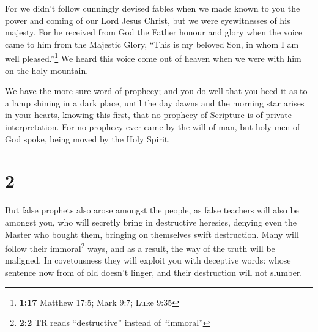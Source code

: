  For we didn't follow cunningly devised fables when we
made known to you the power and coming of our Lord Jesus Christ, but we
were eyewitnesses of his majesty.  For he received from
God the Father honour and glory when the voice came to him from the
Majestic Glory, ``This is my beloved Son, in whom I am well
pleased.''\footnote{\textbf{1:17} Matthew 17:5; Mark 9:7; Luke 9:35}
 We heard this voice come out of heaven when we were with
him on the holy mountain.

 We have the more sure word of prophecy; and you do well
that you heed it as to a lamp shining in a dark place, until the day
dawns and the morning star arises in your hearts, 
knowing this first, that no prophecy of Scripture is of private
interpretation.  For no prophecy ever came by the will of
man, but holy men of God spoke, being moved by the Holy Spirit.

\hypertarget{section-1}{%
\section{2}\label{section-1}}

 But false prophets also arose amongst the people, as
false teachers will also be amongst you, who will secretly bring in
destructive heresies, denying even the Master who bought them, bringing
on themselves swift destruction.  Many will follow their
immoral\footnote{\textbf{2:2} TR reads ``destructive'' instead of
  ``immoral''} ways, and as a result, the way of the truth will be
maligned.  In covetousness they will exploit you with
deceptive words: whose sentence now from of old doesn't linger, and
their destruction will not slumber.

